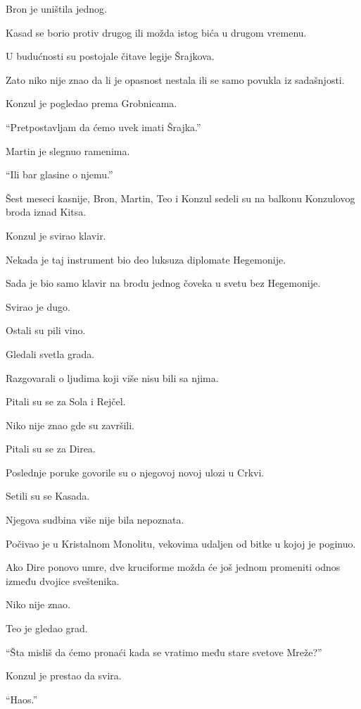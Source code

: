 Bron je uništila jednog.

Kasad se borio protiv drugog ili možda istog bića u drugom vremenu.

U budućnosti su postojale čitave legije Šrajkova.

Zato niko nije znao da li je opasnost nestala ili se samo povukla iz sadašnjosti.

Konzul je pogledao prema Grobnicama.

``Pretpostavljam da ćemo uvek imati Šrajka.''

Martin je slegnuo ramenima.

``Ili bar glasine o njemu.''

\bigskip

Šest meseci kasnije, Bron, Martin, Teo i Konzul sedeli su na balkonu Konzulovog broda iznad Kitsa.

Konzul je svirao klavir.

Nekada je taj instrument bio deo luksuza diplomate Hegemonije.

Sada je bio samo klavir na brodu jednog čoveka u svetu bez Hegemonije.

Svirao je dugo.

Ostali su pili vino.

Gledali svetla grada.

Razgovarali o ljudima koji više nisu bili sa njima.

\bigskip

Pitali su se za Sola i Rejčel.

Niko nije znao gde su završili.

Pitali su se za Direa.

Poslednje poruke govorile su o njegovoj novoj ulozi u Crkvi.

Setili su se Kasada.

Njegova sudbina više nije bila nepoznata.

Počivao je u Kristalnom Monolitu, vekovima udaljen od bitke u kojoj je poginuo.

Ako Dire ponovo umre, dve kruciforme možda će još jednom promeniti odnos između dvojice sveštenika.

Niko nije znao.

\bigskip

Teo je gledao grad.

``Šta misliš da ćemo pronaći kada se vratimo među stare svetove Mreže?''

Konzul je prestao da svira.

``Haos.''

